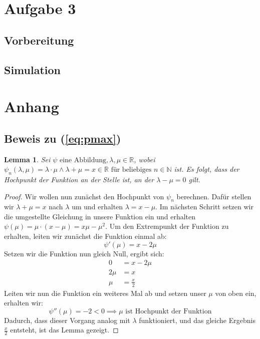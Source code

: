 \documentclass{scrarticle}
\newtheorem{lemma}{Lemma}
\begin{document}
\section{Aufgabe 3}

\subsection{Vorbereitung}
\subsection{Simulation}

\section{Anhang}
\subsection{Beweis zu (\ref{eq:pmax})}
\begin{lemma}
  Sei $\psi\text{ eine Abbildung}, \lambda, \mu \in \mathbb{R}$, wobei $\psi_n(\lambda, \mu) = \lambda \cdot \mu \land \lambda + \mu = x \in \mathbb{R} \text{ für beliebiges }n\in\mathbb{N}$ ist. Es folgt, dass der Hochpunkt der Funktion an der Stelle ist, an der $\lambda - \mu = 0$ gilt.
\end{lemma}
\begin{proof}
  Wir wollen nun zunächst den Hochpunkt von $\psi_n$ berechnen. Dafür stellen wir $\lambda + \mu = x$ nach $\lambda$ um und erhalten $\lambda = x - \mu$.
  Im nächsten Schritt setzen wir die umgestellte Gleichung in unsere Funktion ein und erhalten $\psi(\mu) = \mu \cdot (x - \mu) = x\mu - \mu^2$. Um den Extrempunkt der Funktion zu erhalten, leiten wir zunächst die Funktion einmal ab:
  \begin{equation*}
    \psi'(\mu) = x-2\mu
  \end{equation*}
  Setzen wir die Funktion nun gleich Null, ergibt sich:
  \begin{equation*}
    \begin{aligned}
    0 &= x - 2\mu \\
    2\mu &= x \\
    \mu &= \frac{x}{2}
    \end{aligned}
  \end{equation*}
  Leiten wir nun die Funktion ein weiteres Mal ab und setzen unser $\mu$ von oben ein, erhalten wir:
  \begin{equation*}
    \psi''(\mu) = -2 < 0 \implies \mu\text{ ist Hochpunkt der Funktion}
  \end{equation*}
  Dadurch, dass dieser Vorgang analog mit $\lambda$ funktioniert, und das gleiche Ergebnis $\frac{x}{2}$ entsteht, ist das Lemma gezeigt.
\end{proof}
\end{document}
